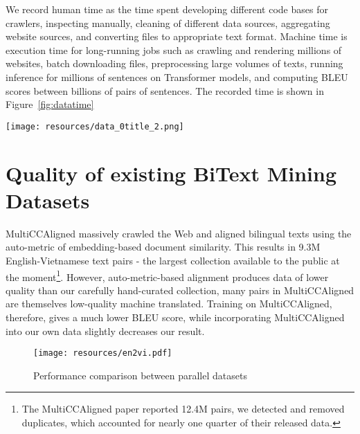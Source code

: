\documentclass[11pt]{article}
\begin{document}
We record human time as the time spent developing different code bases for crawlers, inspecting manually, cleaning of different data sources, aggregating website sources, and converting files to appropriate text format. Machine time is execution time for long-running jobs such as crawling and rendering millions of websites, batch downloading files, preprocessing large volumes of texts, running inference for millions of sentences on Transformer models, and computing BLEU scores between billions of pairs of sentences. The recorded time is shown in Figure~\ref{fig:datatime}

\begin{figure*}[ht!]
    \centering
    \texttt{[image: resources/data\_0title\_2.png]}
    \caption{Time required to 4.2M bitexts, color-coded for four tiers of data sources (1) combine existing open-sourced corpora, (2) score and filter noisy sources, (3) DP alignment from weakly-aligned documents, and (4) manual crawl and clean. With comparable outputs, the time invested is vastly different between them. The most expensive approach is manual crawl and clean, while the most scalable is DP alignment.}
    \label{fig:datatime}
\end{figure*}

\section{Quality of existing BiText Mining Datasets}
\label{app:ccalign}
MultiCCAligned \cite{elkishky_ccaligned_2020} massively crawled the Web and aligned bilingual texts using the auto-metric of embedding-based document similarity. This results in 9.3M English-Vietnamese text pairs - the largest collection available to the public at the moment\footnote{The MultiCCAligned paper reported 12.4M pairs, we detected and removed duplicates, which accounted for nearly one quarter of their released data.}. However, auto-metric-based alignment produces data of lower quality than our carefully hand-curated collection, many pairs in MultiCCAligned are themselves low-quality machine translated. Training on MultiCCAligned, therefore, gives a much lower BLEU score, while incorporating MultiCCAligned into our own data slightly decreases our result.

\begin{figure}[ht!]
    \centering
    \texttt{[image: resources/en2vi.pdf]}
    \caption{Performance comparison between parallel datasets}
    \label{fig:bitext_quality}
\end{figure}
\end{document}
